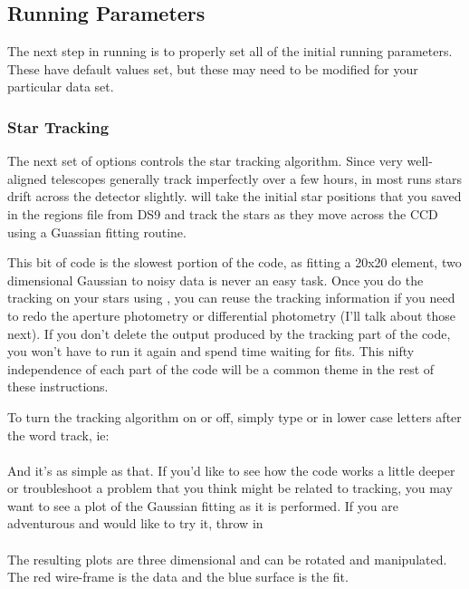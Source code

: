 \documentclass{article}
\begin{document}
\subsection{Running Parameters}
The next step in running \oscaar is to properly set all of the initial running parameters. These have default values set, but these may need to be modified for your particular data set.


\subsubsection{Star Tracking}

The next set of options controls the star tracking algorithm. Since very well-aligned telescopes generally track imperfectly over a few hours, in most runs stars drift across the detector slightly. \oscaar  will take the initial star positions that you saved in the regions file from DS9 and track the stars as they move across the CCD using a Guassian fitting routine. 

	This bit of code is the slowest portion of the code, as fitting a 20x20 element, two dimensional Gaussian to noisy data is never an easy task. Once you do the tracking on your stars using \oscaar, you can reuse the tracking information if you need to redo the aperture photometry or differential photometry (I'll talk about those next). If you don't delete the output produced by the tracking part of the code, you won't have to run it again and spend time waiting for fits. This nifty independence of each part of the code will be a common theme in the rest of these instructions. 

	To turn the tracking algorithm on or off, simply type  or  in lower case letters after the word \textsf{track}, ie:\\
	
\indent {}\\

	And it's as simple as that. If you'd like to see how the code works a little deeper or troubleshoot a problem that you think might be related to tracking, you may want to see a plot of the Gaussian fitting as it is performed. If you are adventurous and would like to try it, throw in\\

\indent {}\\

The resulting plots are three dimensional and can be rotated and manipulated. The red wire-frame is the data and the blue surface is the fit. 
\end{document}
